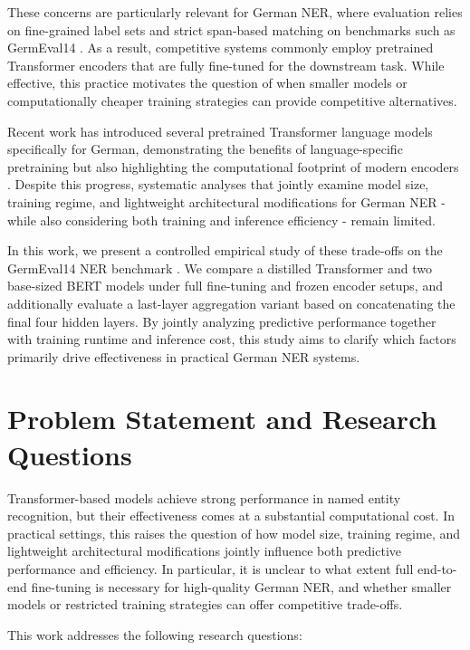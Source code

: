 \documentclass[11pt,a4paper,twocolumn]{article}
\begin{document}
These concerns are particularly relevant for German NER, where evaluation relies on fine-grained label sets and strict span-based matching on benchmarks such as GermEval14 \cite{benikova_germeval_nodate}.
As a result, competitive systems commonly employ pretrained Transformer encoders that are fully fine-tuned for the downstream task.
While effective, this practice motivates the question of when smaller models or computationally cheaper training strategies can provide competitive alternatives.

Recent work has introduced several pretrained Transformer language models specifically for German, demonstrating the benefits of language-specific pretraining but also highlighting the computational footprint of modern encoders \cite{scheible_gottbert_2024}.
Despite this progress, systematic analyses that jointly examine model size, training regime, and lightweight architectural modifications for German NER - while also considering both training and inference efficiency - remain limited.

In this work, we present a controlled empirical study of these trade-offs on the GermEval14 NER benchmark \cite{benikova_germeval_nodate}.
We compare a distilled Transformer and two base-sized BERT models under full fine-tuning and frozen encoder setups, and additionally evaluate a last-layer aggregation variant based on concatenating the final four hidden layers.
By jointly analyzing predictive performance together with training runtime and inference cost, this study aims to clarify which factors primarily drive effectiveness in practical German NER systems.

\section{Problem Statement and Research Questions}

Transformer-based models achieve strong performance in named entity recognition, but their effectiveness comes at a substantial computational cost.
In practical settings, this raises the question of how model size, training regime, and lightweight architectural modifications jointly influence both predictive performance and efficiency.
In particular, it is unclear to what extent full end-to-end fine-tuning is necessary for high-quality German NER, and whether smaller models or restricted training strategies can offer competitive trade-offs.

This work addresses the following research questions:
\end{document}
